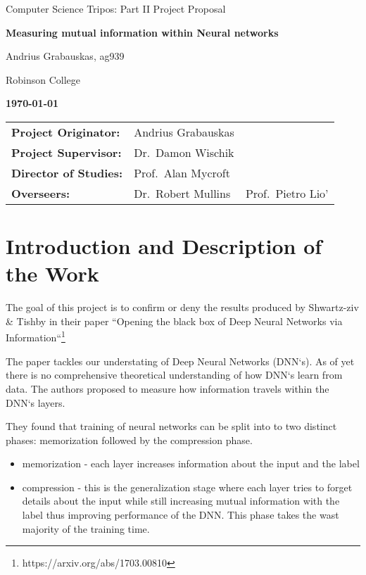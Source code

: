 \documentclass[12pt]{article}
\begin{document}


\thispagestyle{empty}

\centerline{\large Computer Science Tripos: Part II Project Proposal}
\vspace{0.4in}
\centerline{\Large\bf Measuring mutual information within Neural networks}
\vspace{0.3in}

\centerline{Andrius Grabauskas, ag939}
\centerline{Robinson College}

\centerline{\large \textbf{\today}}

\vspace{1in}

\begin{tabular}{ p{4cm} p{4.5cm} l }
{\bf Project Originator:} & Andrius Grabauskas & \\[3mm]
{\bf Project Supervisor:} & Dr.\ Damon Wischik \\[3mm]
{\bf Director of Studies:} & Prof.\ Alan Mycroft \\[3mm]
{\bf Overseers:} & Dr.\ Robert Mullins & Prof.\ Pietro Lio' \\[3mm]
\end{tabular}

\vspace{0.75in}

\section*{Introduction and Description of the Work}

The goal of this project is to confirm or deny the results produced by
Shwartz-ziv \& Tishby in their paper ``Opening the black box of Deep Neural
Networks via Information``\footnote{https://arxiv.org/abs/1703.00810}

The paper tackles our understating of Deep Neural Networks (DNN`s). As of yet
there is no comprehensive theoretical understanding of how DNN`s learn from data.
The authors proposed to measure how information travels within the DNN`s layers.

They found that training of neural networks can be split into to two distinct
phases: memorization followed by the compression phase.
\begin{itemize}
  \item memorization - each layer increases information about the input and the
    label
  \item compression  - this is the generalization stage where each layer tries
    to forget details about the input while still increasing mutual information
    with the label thus improving performance of the DNN. This phase takes the
    wast majority of the training time.
\end{itemize}
\end{document}

